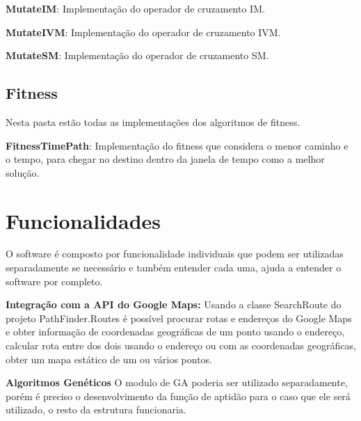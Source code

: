 \textbf{MutateIM}: Implementação do operador de cruzamento IM.

\textbf{MutateIVM}: Implementação do operador de cruzamento IVM.

\textbf{MutateSM}: Implementação do operador de cruzamento SM.

\subsection{Fitness}

Nesta pasta estão todas as implementações dos algoritmos de fitness.

\textbf{FitnessTimePath}: Implementação do fitness que considera o menor caminho e o tempo, para chegar no destino dentro da janela de tempo como a melhor solução.

\section{Funcionalidades}
O software é composto por funcionalidade individuais que podem ser utilizadas separadamente se necessário e também entender cada uma, ajuda a entender o software por completo.

\textbf{Integração com a API do Google Maps:} Usando a classe SearchRoute do projeto PathFinder.Routes é possível procurar rotas e endereços do Google Maps e obter informação de coordenadas geográficas de um ponto usando o endereço, calcular rota entre dos dois usando o endereço ou com as coordenadas geográficas, obter um mapa estático de um ou vários pontos.

\textbf{Algoritmos Genéticos} O modulo de GA poderia ser utilizado separadamente, porém é preciso o desenvolvimento da função de aptidão para o caso que ele será utilizado, o resto da estrutura funcionaria.